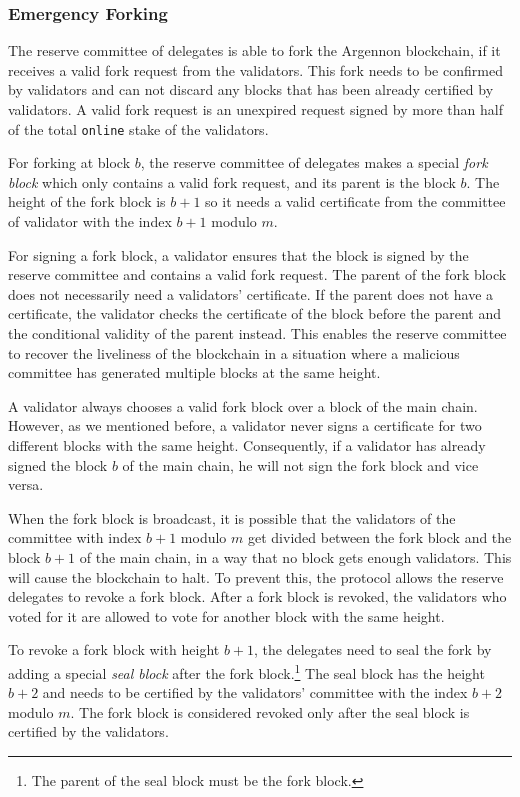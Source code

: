 \subsubsection{Emergency Forking}

The reserve committee of delegates is able to fork the Argennon blockchain, if it receives a valid fork request
from the validators.
This fork needs to be confirmed by validators and can not discard any blocks that has been already certified
by validators.
A valid fork request is an unexpired request signed by more than half of the
total \texttt{online} stake of the validators.

For forking at block $b$, the reserve committee of delegates
makes a special \emph{fork block} which only contains a valid fork request, and its parent is the block $b$.
The height of the fork block is
$b + 1$ so it needs a valid certificate from the committee of validator with the index $b+1$ modulo $m$.

For signing a fork block, a validator ensures that the block is signed by the reserve committee and contains
a valid fork request. The parent of the fork block does not necessarily need a validators' certificate. If the
parent does not have a certificate, the validator checks the certificate of the block before the parent and
the conditional validity of the parent instead. This enables the reserve committee
to recover the liveliness of
the blockchain in a situation where a malicious committee has generated multiple blocks at the same height.

A validator always chooses a valid fork block over a block of the main chain. However, as we mentioned before,
a validator never signs a certificate for two different blocks with the same height. Consequently, if a validator
has already signed the block $b$ of the main chain, he will not sign the fork block and vice versa.

When the fork block is broadcast, it is possible that the validators of the committee with index $b+1$ modulo $m$
get divided between the fork block and the block $b+1$ of the main chain, in a way that no block gets enough validators.
This will cause the blockchain to halt. To prevent this, the protocol allows the reserve delegates to revoke a
fork block. After a fork block
is revoked, the validators who voted for it are allowed to vote for another block with the same
height.

To revoke a fork block with height $b+1$, the delegates need to seal the fork by adding a special
\emph{seal block} after the fork block.\footnote{The parent of the seal block must be the fork block.} The seal block
has the height $b+2$ and needs to be certified by the validators' committee with the
index $b+2$ modulo $m$. The fork block is considered revoked only after the seal block is certified by the validators.

